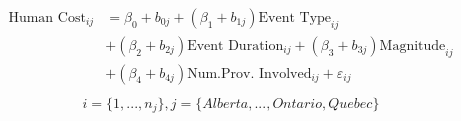 \begin{align}
\begin{split}
\text{Human Cost}_{ij}&=\beta_0+b_{0j}+(\beta_{1}+b_{1j})\text{Event Type}_{ij}\\ &+(\beta_{2}+b_{2j})\text{Event Duration}_{ij}+(\beta_{3}+b_{3j})\text{Magnitude}_{ij}\\ &+(\beta_{4}+b_{4j})\text{Num.Prov. Involved}_{ij}+\varepsilon_{ij}\\
\end{split}
\label{human_province}
\end{align}
\begin{equation*}
i=\{1,...,n_j\},
j=\{Alberta,...,Ontario, Quebec\}
\end{equation*}
